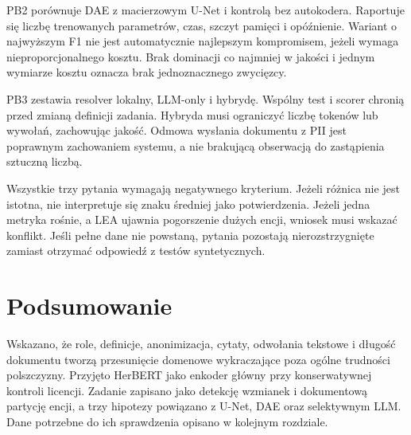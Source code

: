 PB2 porównuje DAE z macierzowym U-Net i kontrolą bez autokodera. Raportuje się liczbę trenowanych parametrów, czas, szczyt pamięci i opóźnienie. Wariant o najwyższym F1 nie jest automatycznie najlepszym kompromisem, jeżeli wymaga nieproporcjonalnego kosztu. Brak dominacji co najmniej w jakości i jednym wymiarze kosztu oznacza brak jednoznacznego zwycięzcy.

PB3 zestawia resolver lokalny, LLM-only i hybrydę. Wspólny test i scorer chronią przed zmianą definicji zadania. Hybryda musi ograniczyć liczbę tokenów lub wywołań, zachowując jakość. Odmowa wysłania dokumentu z PII jest poprawnym zachowaniem systemu, a nie brakującą obserwacją do zastąpienia sztuczną liczbą.

Wszystkie trzy pytania wymagają negatywnego kryterium. Jeżeli różnica nie jest istotna, nie interpretuje się znaku średniej jako potwierdzenia. Jeżeli jedna metryka rośnie, a LEA ujawnia pogorszenie dużych encji, wniosek musi wskazać konflikt. Jeśli pełne dane nie powstaną, pytania pozostają nierozstrzygnięte zamiast otrzymać odpowiedź z testów syntetycznych.

\section{Podsumowanie}

Wskazano, że role, definicje, anonimizacja, cytaty, odwołania tekstowe i długość dokumentu tworzą przesunięcie domenowe wykraczające poza ogólne trudności polszczyzny. Przyjęto HerBERT jako enkoder główny przy konserwatywnej kontroli licencji. Zadanie zapisano jako detekcję wzmianek i dokumentową partycję encji, a trzy hipotezy powiązano z U-Net, DAE oraz selektywnym LLM. Dane potrzebne do ich sprawdzenia opisano w kolejnym rozdziale.
